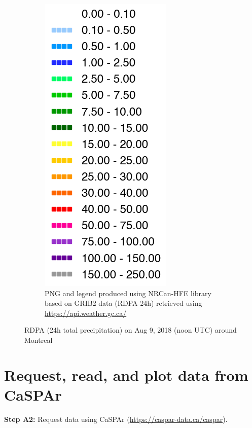 \documentclass[10pt,a4paper,titlepage,parskip]{scrartcl}
\begin{document}
\begin{figure}[h]
\begin{subfigure}[b]{0.45\textwidth}
		\hspace*{0.5cm}
		\includegraphics[height=0.58\linewidth]{figures/test-map-geomet-nrcan-hfe-rdpa24_legend.png}
		\caption{PNG and legend produced using NRCan-HFE library based on GRIB2 data (RDPA-24h) retrieved using \url{https://api.weather.gc.ca/}}
		\label{fig:plot_example:api-weather}
	\end{subfigure}
	\caption{RDPA (24h total precipitation) on Aug 9, 2018 (noon UTC) around Montreal}
	\label{fig:plot_example_geomet-api_vs_geomet-nrcan-hfe}
\end{figure}

\pagebreak

\section{Request, read, and plot data from CaSPAr}

\textbf{Step A2:} Request data using CaSPAr (\url{https://caspar-data.ca/caspar}).
\end{document}
